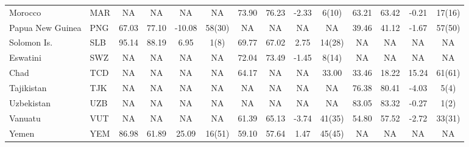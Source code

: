 \begin{longtable}{m{2.4cm}lcccc|cccc|cccc}
Morocco                           & MAR           & NA               & NA                 & NA               & NA               & 73.90    & 76.23      & -2.33    & 6(10)    & 63.21           & 63.42             & -0.21           & 17(16)          \\
Papua New Guinea                  & PNG           & 67.03            & 77.10              & -10.08           & 58(30)           & NA       & NA         & NA       & NA       & 39.46           & 41.12             & -1.67           & 57(50)          \\
Solomon Is.                   & SLB           & 95.14            & 88.19              & 6.95             & 1(8)             & 69.77    & 67.02      & 2.75     & 14(28)   & NA              & NA                & NA              & NA              \\
Eswatini                          & SWZ           & NA               & NA                 & NA               & NA               & 72.04    & 73.49      & -1.45    & 8(14)    & NA              & NA                & NA              & NA              \\
Chad                              & TCD           & NA               & NA                 & NA               & NA               & 64.17    & NA         & NA       & 33.00    & 33.46           & 18.22             & 15.24           & 61(61)          \\
Tajikistan                        & TJK           & NA               & NA                 & NA               & NA               & NA       & NA         & NA       & NA       & 76.38           & 80.41             & -4.03           & 5(4)            \\
Uzbekistan                        & UZB           & NA               & NA                 & NA               & NA               & NA       & NA         & NA       & NA       & 83.05           & 83.32             & -0.27           & 1(2)            \\
Vanuatu                           & VUT           & NA               & NA                 & NA               & NA               & 61.39    & 65.13      & -3.74    & 41(35)   & 54.80           & 57.52             & -2.72           & 33(31)          \\
Yemen                             & YEM           & 86.98            & 61.89              & 25.09            & 16(51)           & 59.10    & 57.64      & 1.47     & 45(45)   & NA              & NA                & NA              & NA             
  \\ \hline   \hline  
 \end{longtable}
 \endgroup
